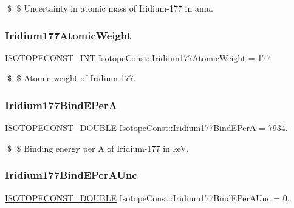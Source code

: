 \$ \$ Uncertainty in atomic mass of Iridium-\/177 in amu. \mbox{\label{group___isotope_const-_iridium-_ir177_gad6b8d69649390a48e21d7ddbd297da73}} 
\subsubsection{\texorpdfstring{Iridium177\+Atomic\+Weight}{Iridium177AtomicWeight}}
{\footnotesize\ttfamily \mbox{\hyperlink{group___isotope_const-_macros_ga5f18360b3e99483a35c32d789e62621c}{I\+S\+O\+T\+O\+P\+E\+C\+O\+N\+S\+T\+\_\+\+I\+NT}} Isotope\+Const\+::\+Iridium177\+Atomic\+Weight = 177}

\$ \$ Atomic weight of Iridium-\/177. \mbox{\label{group___isotope_const-_iridium-_ir177_ga146755526c560c032ca2f1f908997aff}} 
\subsubsection{\texorpdfstring{Iridium177\+Bind\+E\+PerA}{Iridium177BindEPerA}}
{\footnotesize\ttfamily \mbox{\hyperlink{group___isotope_const-_macros_ga8f45a7272ce02c0b4c65c44636ed719a}{I\+S\+O\+T\+O\+P\+E\+C\+O\+N\+S\+T\+\_\+\+D\+O\+U\+B\+LE}} Isotope\+Const\+::\+Iridium177\+Bind\+E\+PerA = 7934.}

\$ \$ Binding energy per A of Iridium-\/177 in keV. \mbox{\label{group___isotope_const-_iridium-_ir177_ga7c7dbedbd118d2e2062976a95019f5a3}} 
\subsubsection{\texorpdfstring{Iridium177\+Bind\+E\+Per\+A\+Unc}{Iridium177BindEPerAUnc}}
{\footnotesize\ttfamily \mbox{\hyperlink{group___isotope_const-_macros_ga8f45a7272ce02c0b4c65c44636ed719a}{I\+S\+O\+T\+O\+P\+E\+C\+O\+N\+S\+T\+\_\+\+D\+O\+U\+B\+LE}} Isotope\+Const\+::\+Iridium177\+Bind\+E\+Per\+A\+Unc = 0.}

